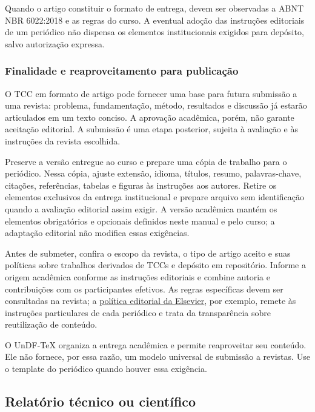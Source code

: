 Quando o artigo constituir o formato de entrega, devem ser observadas a ABNT NBR 6022:2018 e as regras do curso. A eventual adoção das instruções editoriais de um periódico não dispensa os elementos institucionais exigidos para depósito, salvo autorização expressa.

\subsubsection{Finalidade e reaproveitamento para publicação}

O TCC em formato de artigo pode fornecer uma base para futura submissão a uma revista: problema, fundamentação, método, resultados e discussão já estarão articulados em um texto conciso. A aprovação acadêmica, porém, não garante aceitação editorial. A submissão é uma etapa posterior, sujeita à avaliação e às instruções da revista escolhida.

Preserve a versão entregue ao curso e prepare uma cópia de trabalho para o periódico. Nessa cópia, ajuste extensão, idioma, títulos, resumo, palavras-chave, citações, referências, tabelas e figuras às instruções aos autores. Retire os elementos exclusivos da entrega institucional e prepare arquivo sem identificação quando a avaliação editorial assim exigir. A versão acadêmica mantém os elementos obrigatórios e opcionais definidos neste manual e pelo curso; a adaptação editorial não modifica essas exigências.

Antes de submeter, confira o escopo da revista, o tipo de artigo aceito e suas políticas sobre trabalhos derivados de TCCs e depósito em repositório. Informe a origem acadêmica conforme as instruções editoriais e combine autoria e contribuições com os participantes efetivos. As regras específicas devem ser consultadas na revista; a \href{https://www.elsevier.com/about/policies-and-standards/publishing-ethics}{política editorial da Elsevier}, por exemplo, remete às instruções particulares de cada periódico e trata da transparência sobre reutilização de conteúdo.

O UnDF-TeX organiza a entrega acadêmica e permite reaproveitar seu conteúdo. Ele não fornece, por essa razão, um modelo universal de submissão a revistas. Use o template do periódico quando houver essa exigência.

\subsection{Relatório técnico ou científico}

